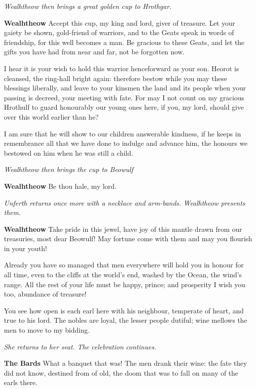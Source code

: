 \documentclass[a4paper]{article}
\begin{document}
{\centerline{\textit{Wealhtheow then brings a great golden cup to Hrothgar.}}

\textbf{Wealhtheow} Accept this cup, my king and lord,
giver of treasure. Let your gaiety be shown,
gold-friend of warriors, and to the Geats speak
in words of friendship, for this well becomes a man.
Be gracious to these Geats, and let the gifts you have had
from near and far, not be forgotten now.

I hear it is your wish to hold this warrior
henceforward as your son. Heorot is cleansed,
the ring-hall bright again: therefore bestow while you may
these blessings liberally, and leave to your kinsmen
the land and its people when your passing is decreed,
your meeting with fate. For may I not count
on my gracious Hrothulf to guard honourably
our young ones here, if you, my lord,
should give over this world earlier than he?

\newpage
I am sure that he will show to our children
answerable kindness, if he keeps in remembrance
all that we have done to indulge and advance him,
the honours we bestowed on him when he was still a child.

\centerline{\textit{Wealhtheow then brings the cup to Beowulf}}

\textbf{Wealhtheow} Be thou hale, my lord.

\centerline{\textit{Unferth returns once more with a necklace and arm-bands. Wealhtheow presents them.}}

\textbf{Wealhtheow} Take pride in this jewel, have joy of this mantle
drawn from our treasuries, most dear Beowulf!
May fortune come with them and may you flourish in your youth!

Already you have so managed that men everywhere
will hold you in honour for all time,
even to the cliffs at the world's end, washed by the Ocean,
the wind's range. All the rest of your life
must be happy, prince; and prosperity I wish you too,
abundance of treasure! 

You see how open is each earl here with his neighbour,
temperate of heart, and true to his lord.
The nobles are loyal, the lesser people dutiful;
wine mellows the men to move to my bidding.

\centerline{\textit{She returns to her seat. The celebration continues.}}

\textbf{The Bards} What a banquet that was!
The men drank their wine: the fate they did not know,
destined from of old, the doom that was to fall
on many of the earls there.

}
\end{document}
